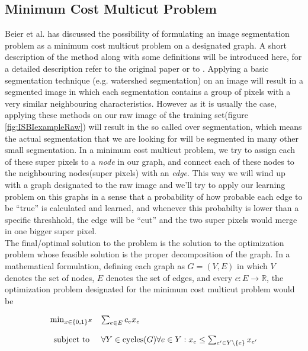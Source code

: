\documentclass[12pt, a4paper]{scrartcl}
\begin{document}
\subsection{Minimum Cost Multicut Problem}
\label{sec:multicut}
Beier et al. \citep{6078} has discussed the possibility of formulating an image segmentation problem as a minimum cost multicut problem on a designated graph. A short description of the method along with some definitions will be introduced here, for a detailed description refer to the original paper or to \citep{26, 27}. Applying a basic segmentation technique (e.g. watershed segmentation) on an image will result in a segmented image in which each segmentation contains a group of pixels with a very similar neighbouring characteristics. However as it is usually the case, applying these methods on our raw image of the training set(figure \ref{fig:ISBIexampleRaw}) will result in the so called over segmentation, which means the actual segmentation that we are looking for will be segmented in many other small segmentation. In a minimum cost multicut problem, we try to assign each of these super pixels to a \emph{node} in our graph, and connect each of these nodes to the neighbouring nodes(super pixels) with an \emph{edge}. This way we will wind up with a graph designated to the raw image and we'll try to apply our learning problem on this graphs in a sense that a probability of how probable each edge to be ``true'' is calculated and learned, and whenever this probabilty is lower than a specific threshhold, the edge will be ``cut'' and the two super pixels would merge in one bigger super pixel. \\

The final/optimal solution to the problem is the solution to the optimization problem whose feasible solution is the proper decomposition of the graph. In a mathematical formulation, defining each graph as $G = (V, E)$ in which $V$ denotes the set of nodes, $E$ denotes the set of edges, and every $c : E \rightarrow \mathbb { R }$, the optimization problem designated for the minimum cost multicut problem would be

\begin{equation} \label{equ:multicutProblem}
\begin{array} { c l } { \min _ { x \in \{ 0,1 \} ^ { E } } } & { \sum _ { e \in E } c _ { e } x _ { e } } \\  \\{ \text { subject to } } & { \forall Y \in \operatorname { cycles } ( G ) \forall e \in Y : x _ { e } \leq \sum _ { e ^ { \prime } \in Y \backslash \{ e \} } x _ { e ^ { \prime } } } \end{array}
\end{equation}
\end{document}
